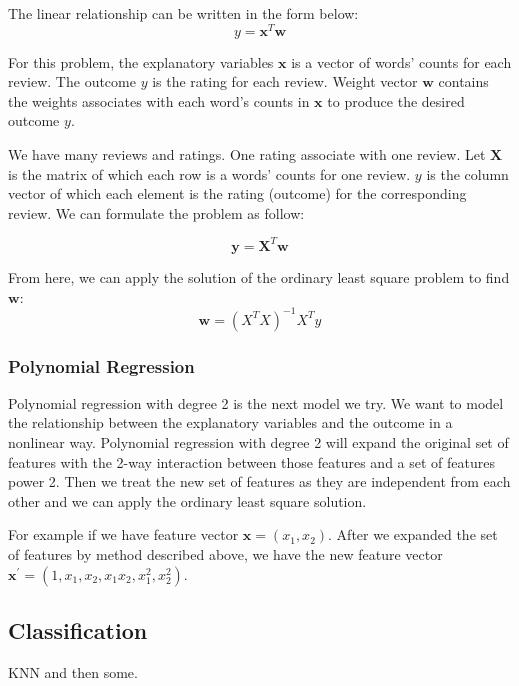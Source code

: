 The linear relationship can be written in the form below:
\begin{equation*}
y = \mathbf{x}^T\mathbf{w}
\end{equation*}

For this problem, the explanatory variables $\mathbf{x}$ is a vector of words' counts for each review. The outcome $y$ is the rating for each review. Weight vector $\mathbf{w}$ contains the weights associates with each word's counts in $\mathbf{x}$ to produce the desired outcome $y$.

We have many reviews and ratings. One rating associate with one review. Let $\mathbf{X}$ is the matrix of which each row is a words' counts for one review. $y$ is the column vector of which each element is the rating (outcome) for the corresponding review. We can formulate the problem as follow:

\begin{equation*}
\mathbf{y} = \mathbf{X}^T\mathbf{w}
\end{equation*}

From here, we can apply the solution of the ordinary least square problem to find $\mathbf{w}$:
\begin{equation*}
\mathbf{w} = (X^TX)^{-1}X^Ty
\end{equation*}

\subsubsection{Polynomial Regression}
Polynomial regression with degree 2 is the next model we try. We want to model the relationship between the explanatory variables and the outcome in a nonlinear way. Polynomial regression with degree 2 will expand the original set of features with the 2-way interaction between those features and a set of features power 2. Then we treat the new set of features as they are independent from each other and we can apply the ordinary least square solution.

For example if we have feature vector $\mathbf{x} = (x_1, x_2)$. After we expanded the set of features by method described above, we have the new feature vector $\mathbf{x}^{'} = (1, x_1, x_2, x_1x_2, x_1^2, x_2^2)$.


\subsection{Classification}

KNN and then some.

